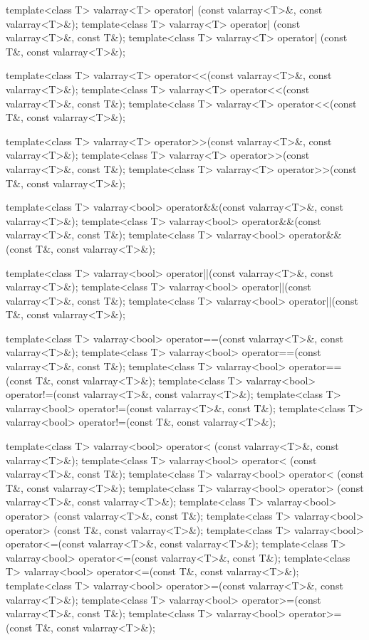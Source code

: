 \begin{codeblock}
{  template<class T> valarray<T> operator| (const valarray<T>&, const valarray<T>&);
  template<class T> valarray<T> operator| (const valarray<T>&, const T&);
  template<class T> valarray<T> operator| (const T&, const valarray<T>&);

  template<class T> valarray<T> operator<<(const valarray<T>&, const valarray<T>&);
  template<class T> valarray<T> operator<<(const valarray<T>&, const T&);
  template<class T> valarray<T> operator<<(const T&, const valarray<T>&);

  template<class T> valarray<T> operator>>(const valarray<T>&, const valarray<T>&);
  template<class T> valarray<T> operator>>(const valarray<T>&, const T&);
  template<class T> valarray<T> operator>>(const T&, const valarray<T>&);

  template<class T> valarray<bool> operator&&(const valarray<T>&, const valarray<T>&);
  template<class T> valarray<bool> operator&&(const valarray<T>&, const T&);
  template<class T> valarray<bool> operator&&(const T&, const valarray<T>&);

  template<class T> valarray<bool> operator||(const valarray<T>&, const valarray<T>&);
  template<class T> valarray<bool> operator||(const valarray<T>&, const T&);
  template<class T> valarray<bool> operator||(const T&, const valarray<T>&);

  template<class T> valarray<bool> operator==(const valarray<T>&, const valarray<T>&);
  template<class T> valarray<bool> operator==(const valarray<T>&, const T&);
  template<class T> valarray<bool> operator==(const T&, const valarray<T>&);
  template<class T> valarray<bool> operator!=(const valarray<T>&, const valarray<T>&);
  template<class T> valarray<bool> operator!=(const valarray<T>&, const T&);
  template<class T> valarray<bool> operator!=(const T&, const valarray<T>&);

  template<class T> valarray<bool> operator< (const valarray<T>&, const valarray<T>&);
  template<class T> valarray<bool> operator< (const valarray<T>&, const T&);
  template<class T> valarray<bool> operator< (const T&, const valarray<T>&);
  template<class T> valarray<bool> operator> (const valarray<T>&, const valarray<T>&);
  template<class T> valarray<bool> operator> (const valarray<T>&, const T&);
  template<class T> valarray<bool> operator> (const T&, const valarray<T>&);
  template<class T> valarray<bool> operator<=(const valarray<T>&, const valarray<T>&);
  template<class T> valarray<bool> operator<=(const valarray<T>&, const T&);
  template<class T> valarray<bool> operator<=(const T&, const valarray<T>&);
  template<class T> valarray<bool> operator>=(const valarray<T>&, const valarray<T>&);
  template<class T> valarray<bool> operator>=(const valarray<T>&, const T&);
  template<class T> valarray<bool> operator>=(const T&, const valarray<T>&);

}
\end{codeblock}
